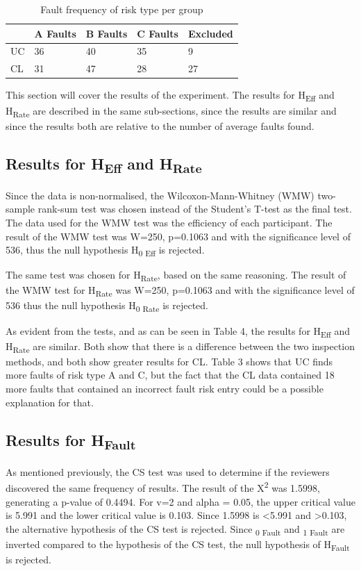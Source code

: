 \documentclass[10pt,twocolumn]{article}
\begin{document}
\begin{table}
	\centering
	\begin{tabular}[ht]{| l | l | l | l | l |}
	\hline
	 & A Faults & B Faults & C Faults & Excluded\\
	\hline
	UC & 36 & 40 & 35 & 9\\
	\hline
	CL & 31 & 47 & 28 & 27\\
	\hline
	\end{tabular}
	\caption{Fault frequency of risk type per group}
\end{table}

This section will cover the results of the experiment. The results for H\textsubscript{Eff} and H\textsubscript{Rate} are described in the same sub-sections, since the results are similar and since the results both are relative to the number of average faults found. 

\subsection{Results for H\textsubscript{Eff} and H\textsubscript{Rate}}
Since the data is non-normalised, the Wilcoxon-Mann-Whitney (WMW) two-sample rank-sum test was chosen instead of the Student's T-test as the final test. The data used for the WMW test was the efficiency of each participant. The result of the WMW test was W=250, p=0.1063 and with the significance level of 536, thus the null hypothesis H\textsubscript{0 Eff} is rejected. 

The same test was chosen for H\textsubscript{Rate}, based on the same reasoning. The result of the WMW test for H\textsubscript{Rate} was W=250, p=0.1063 and with the significance level of 536 thus the null hypothesis H\textsubscript{0 Rate} is rejected. 

As evident from the tests, and as can be seen in Table 4, the results for H\textsubscript{Eff} and H\textsubscript{Rate} are similar. Both show that there is a difference between the two inspection methods, and both show greater results for CL. Table 3 shows that UC finds more faults of risk type A and C, but the fact that the CL data contained 18 more faults that contained an incorrect fault risk entry could be a possible explanation for that. 


\subsection{Results for H\textsubscript{Fault}}
As mentioned previously, the CS test was used to determine if the reviewers discovered the same frequency of results. The result of the X\textsuperscript{2} was 1.5998, generating a p-value of 0.4494. For v=2 and alpha = 0.05, the upper critical value is 5.991 and the lower critical value is 0.103. Since 1.5998 is \textless 5.991 and \textgreater 0.103, the alternative hypothesis of the CS test is rejected. Since \textsubscript{0 Fault} and \textsubscript{1 Fault} are inverted compared to the hypothesis of the CS test, the null hypothesis of H\textsubscript{Fault} is rejected.
\end{document}

